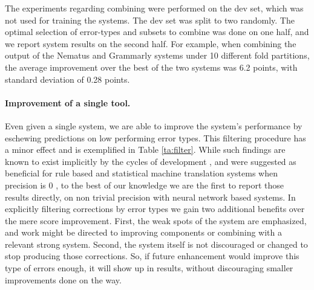 \documentclass[11pt,a4paper]{article}
\begin{document}
The experiments regarding combining were performed on the dev set, which was not used for training the systems. The dev set was split to two randomly. The optimal selection of error-types and subsets to combine was done on one half, and we report system results on the second half. For example, when combining the output of the Nematus and Grammarly systems under 10 different fold partitions, the average  improvement over the best of the two systems was 6.2 points, with standard deviation of 0.28 points.  

\paragraph{Improvement of a single tool.}

Even given a single system, we are able to improve the system's performance by eschewing predictions on low performing error types.  This filtering procedure has a minor effect and is exemplified in Table \ref{ta:filter}. While such findings are known to exist implicitly by the cycles of development \cite{choshen2018inherent}, and were suggested as beneficial for rule based and statistical machine translation systems when precision is 0 \cite{felice2014grammatical}, to the best of our knowledge we are the first to report those results directly, on non trivial precision with neural network based systems. In explicitly filtering corrections by error types we gain two additional benefits over the mere score improvement. First, the weak spots of the system are emphasized, and work might be directed to improving components or combining with a relevant strong system.  Second, the system itself is not discouraged or changed to stop producing those corrections. So, if future enhancement would improve this type of errors enough, it will show up in results, without discouraging smaller improvements done on the way.

\begin{table}[htb]
\caption{Change in performance when avoiding hard errors. \label{ta:filter}}
\end{table}
\end{document}
